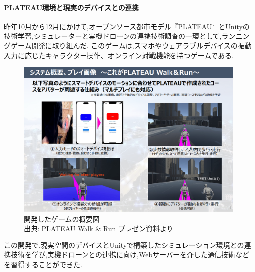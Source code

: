 \documentclass{article}[jsarticle]
\begin{document}
\paragraph{PLATEAU環境と現実のデバイスとの連携}
昨年10月から12月にかけて,オープンソース都市モデル『PLATEAU』とUnityの技術学習,シミュレーターと実機ドローンの連携技術調査の一環として,ランニングゲーム開発に取り組んだ.
このゲームは,スマホやウェアラブルデバイスの振動入力に応じたキャラクター操作、オンライン対戦機能を持つゲームである.\par 
\begin{figure}[H]
    \centering
    \includegraphics[width=\textwidth]{./Images/20240203210512.png}
    \captionsetup{justification=centering}
    \caption{
        開発したゲームの概要図 \\
        出典: \href{https://drive.google.com/open?id=1h9RfnF3vWpDXi8VVIgJQpXlENGdLFr7n&usp=drive_fs}{PLATEAU Walk \& Run プレゼン資料より}
    }
\end{figure}
この開発で,現実空間のデバイスとUnityで構築したシミュレーション環境との連携技術を学び,実機ドローンとの連携に向け,Webサーバーを介した通信技術などを習得することができた.
\end{document}
